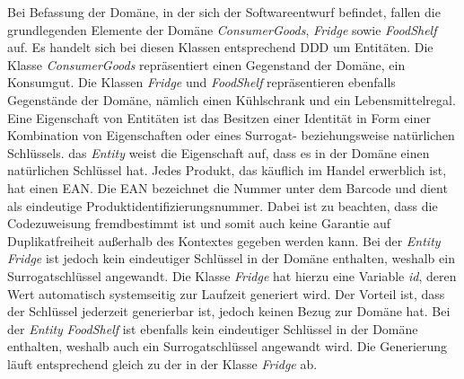 
\label{domaindrivendesign>entities}
Bei Befassung der Domäne, in der sich der Softwareentwurf befindet, fallen die grundlegenden Elemente der Domäne \textit{ConsumerGoods}, \textit{Fridge} sowie \textit{FoodShelf} auf.
Es handelt sich bei diesen Klassen entsprechend \ac{DDD} um Entitäten.
Die Klasse \textit{ConsumerGoods} repräsentiert einen Gegenstand der Domäne, ein Konsumgut.
Die Klassen \textit{Fridge} und \textit{FoodShelf} repräsentieren ebenfalls Gegenstände der Domäne, nämlich einen Kühlschrank und ein Lebensmittelregal.
Eine Eigenschaft von Entitäten ist das Besitzen einer Identität in Form einer Kombination von Eigenschaften oder eines Surrogat- beziehungsweise natürlichen Schlüssels.
das \textit{Entity} weist die Eigenschaft auf, dass es in der Domäne einen natürlichen Schlüssel hat.
Jedes Produkt, das käuflich im Handel erwerblich ist, hat einen \ac{EAN}.
Die \ac{EAN} bezeichnet die Nummer unter dem Barcode und dient als eindeutige Produktidentifizierungsnummer.
Dabei ist zu beachten, dass die Codezuweisung fremdbestimmt ist und somit auch keine Garantie auf Duplikatfreiheit außerhalb des Kontextes gegeben werden kann.
Bei der \textit{Entity} \textit{Fridge} ist jedoch kein eindeutiger Schlüssel in der Domäne enthalten, weshalb ein Surrogatschlüssel angewandt.
Die Klasse \textit{Fridge} hat hierzu eine Variable \textit{id}, deren Wert automatisch systemseitig zur Laufzeit generiert wird.
Der Vorteil ist, dass der Schlüssel jederzeit generierbar ist, jedoch keinen Bezug zur Domäne hat.
Bei der \textit{Entity} \textit{FoodShelf} ist ebenfalls kein eindeutiger Schlüssel in der Domäne enthalten, weshalb auch ein Surrogatschlüssel angewandt wird.
Die Generierung läuft entsprechend gleich zu der in der Klasse \textit{Fridge} ab.


